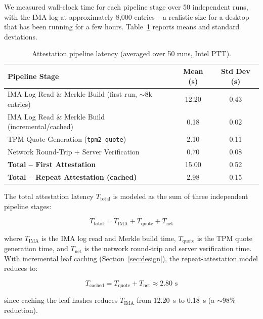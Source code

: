 \documentclass[11pt]{article}
\begin{document}
We measured wall-clock time for each pipeline stage over 50 independent runs, with the IMA log at approximately 8,000 entries -- a realistic size for a desktop that has been running for a few hours. Table~\ref{tab:latency} reports means and standard deviations.

\begin{table}[h]
\centering
\caption{Attestation pipeline latency (averaged over 50 runs, Intel PTT).}
\label{tab:latency}
\begin{tabular}{@{}lcc@{}}
\toprule
\textbf{Pipeline Stage} & \textbf{Mean (s)} & \textbf{Std Dev (s)} \\
\midrule
IMA Log Read \& Merkle Build (first run, $\sim$8k entries) & 12.20 & 0.43 \\
IMA Log Read \& Merkle Build (incremental/cached)          &  0.18 & 0.02 \\
TPM Quote Generation (\texttt{tpm2\_quote})                &  2.10 & 0.11 \\
Network Round-Trip + Server Verification                    &  0.70 & 0.08 \\
\midrule
\textbf{Total -- First Attestation}                        & 15.00 & 0.52 \\
\textbf{Total -- Repeat Attestation (cached)}              &  2.98 & 0.15 \\
\bottomrule
\end{tabular}
\end{table}

The total attestation latency $T_{\text{total}}$ is modeled as the sum of three independent pipeline stages:

\begin{equation}
  T_{\text{total}} = T_{\text{IMA}} + T_{\text{quote}} + T_{\text{net}}
  \label{eq:latency}
\end{equation}

\noindent where $T_{\text{IMA}}$ is the IMA log read and Merkle build time, $T_{\text{quote}}$ is the TPM quote generation time, and $T_{\text{net}}$ is the network round-trip and server verification time. With incremental leaf caching (Section~\ref{sec:design}), the repeat-attestation model reduces to:

\begin{equation}
  T_{\text{cached}} = T_{\text{quote}} + T_{\text{net}} \approx 2.80\text{ s}
  \label{eq:latency-cached}
\end{equation}

since caching the leaf hashes reduces $T_{\text{IMA}}$ from 12.20~s to 0.18~s (a $\sim$98\% reduction).
\end{document}
